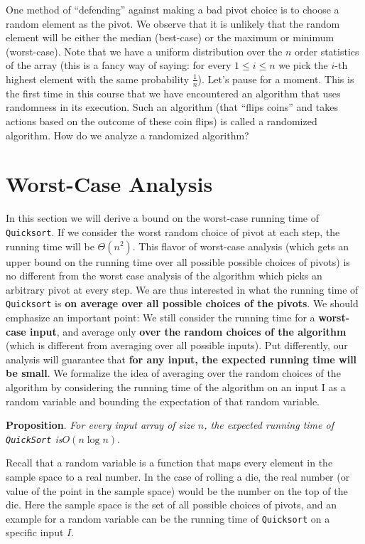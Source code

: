 \documentclass [12pt]{article}
\begin{document}
One method of ``defending'' against making a bad pivot choice is to choose a random element
as the pivot. We observe that it is unlikely that the random element will be either the
median (best-case) or the maximum or minimum (worst-case). Note that we have a uniform
distribution over the $n$ order statistics of the array (this is a fancy way of saying: for every
$1 \leq i \leq n$ we pick the $i$-th highest element with the same probability $\frac{1}{n}$). Let's pause for a moment. This is the first time in this course that we have encountered an algorithm that uses randomness in its execution. Such an algorithm (that ``flips coins'' and takes actions based on the outcome of these coin flips) is called a randomized algorithm. How do we analyze a randomized algorithm?

\section{Worst-Case Analysis}
In this section we will derive a bound on the worst-case running time of \texttt{Quicksort}. If we
consider the worst random choice of pivot at each step, the running time will be $\Theta(n^2)$. This flavor of worst-case analysis (which gets an upper bound on the running time over all possible possible choices of pivots) is no different from the worst case analysis of the algorithm which picks an arbitrary pivot at every step. We are thus interested in what the running time of \texttt{Quicksort} is \textbf{on average over all possible choices of the pivots}. We should emphasize an important point: We still consider the running time for a \textbf{worst-case input}, and average only \textbf{over the random choices of the algorithm} (which is different from averaging over all possible inputs). Put differently, our analysis will guarantee that \textbf{for any input, the expected running time will be small}. We formalize the idea of averaging over the random choices of the algorithm by considering the running time of the algorithm on an input I as a random variable and bounding the expectation of that random variable.


\textbf{Proposition}. \textit{For every input array of size $n$, the expected running time of \texttt{QuickSort} is$O(n \log n)$}.

Recall that a random variable is a function that maps every element in the sample space to a real number. In the case of rolling a die, the real number (or value of the point in the sample space) would be the number on the top of the die. Here the sample space is the set of all possible choices of pivots, and an example for a random variable can be the running time of \texttt{Quicksort} on a specific input $I$.
\end{document}
